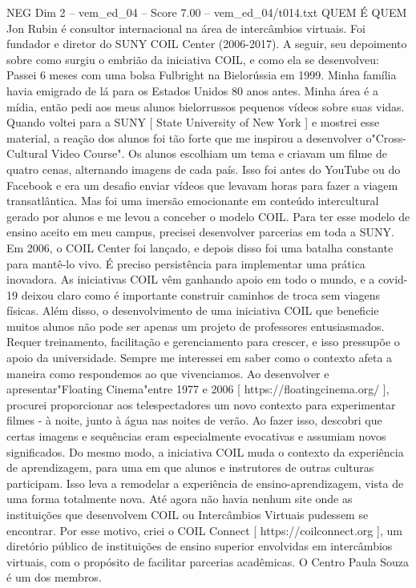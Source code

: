 \begin{textsample}{NEG Dim 2 – vem\_ed\_04 – Score 7.00 – vem\_ed\_04/t014.txt}  \label{ex:f2_neg_134}
QUEM É QUEM Jon Rubin é consultor internacional na área de intercâmbios virtuais.
Foi fundador e diretor do SUNY COIL Center (2006-2017).
A seguir, seu depoimento sobre como surgiu o embrião da iniciativa COIL, e como ela se desenvolveu: Passei 6 meses com uma bolsa Fulbright na Bielorússia em 1999.
Minha família havia emigrado de lá para os Estados Unidos 80 anos antes.
Minha área é a mídia, então pedi aos meus alunos bielorrussos pequenos vídeos sobre suas vidas.
Quando voltei para a SUNY [ State University of New York ] e mostrei esse material, a reação dos alunos foi tão forte que me inspirou a desenvolver o"Cross-Cultural Video Course".
Os alunos escolhiam um tema e criavam um filme de quatro cenas, alternando imagens de cada país.
Isso foi antes do YouTube ou do Facebook e era um desafio enviar vídeos que levavam horas para fazer a viagem transatlântica.
Mas foi uma imersão emocionante em conteúdo intercultural gerado por alunos e me levou a conceber o modelo COIL.
Para ter esse modelo de ensino aceito em meu campus, precisei desenvolver parcerias em toda a SUNY.
Em 2006, o COIL Center foi lançado, e depois disso foi uma batalha constante para mantê-lo vivo.
É preciso persistência para implementar uma prática inovadora.
As iniciativas COIL vêm ganhando apoio em todo o mundo, e a covid-19 deixou claro como é importante construir caminhos de troca sem viagens físicas.
Além disso, o desenvolvimento de uma iniciativa COIL que beneficie muitos alunos não pode ser apenas um projeto de professores entusiasmados.
Requer treinamento, facilitação e gerenciamento para crescer, e isso pressupõe o apoio da universidade.
Sempre me interessei em saber como o contexto afeta a maneira como respondemos ao que vivenciamos.
Ao desenvolver e apresentar"Floating Cinema"entre 1977 e 2006 [ https://floatingcinema.org/ ], procurei proporcionar aos telespectadores um novo contexto para experimentar filmes - à noite, junto à água nas noites de verão.
Ao fazer isso, descobri que certas imagens e sequências eram especialmente evocativas e assumiam novos significados.
Do mesmo modo, a iniciativa COIL muda o contexto da experiência de aprendizagem, para uma em que alunos e instrutores de outras culturas participam.
Isso leva a remodelar a experiência de ensino-aprendizagem, vista de uma forma totalmente nova.
Até agora não havia nenhum site onde as instituições que desenvolvem COIL ou Intercâmbios Virtuais pudessem se encontrar.
Por esse motivo, criei o COIL Connect [ https://coilconnect.org ], um diretório público de instituições de ensino superior envolvidas em intercâmbios virtuais, com o propósito de facilitar parcerias acadêmicas.
O Centro Paula Souza é um dos membros.

\end{textsample}
